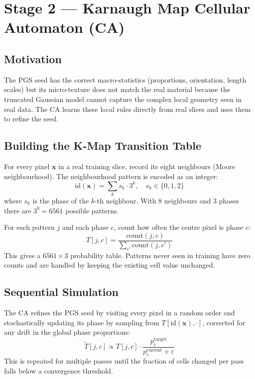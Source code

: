 \documentclass[11pt, a4paper]{article}
\begin{document}
\section{Stage 2 --- Karnaugh Map Cellular Automaton (CA)}

\subsection{Motivation}

The PGS seed has the correct macro-statistics (proportions, orientation, length scales) but its micro-texture does not match the real material because the truncated Gaussian model cannot capture the complex local geometry seen in real data. The CA learns these local rules directly from real slices and uses them to refine the seed.

\subsection{Building the K-Map Transition Table}

For every pixel $\mathbf{x}$ in a real training slice, record its eight neighbours (Moore neighbourhood). The neighbourhood pattern is encoded as an integer:
\begin{equation}
    \text{id}(\mathbf{x}) = \sum_{k} s_k \cdot 3^k, \quad s_k \in \{0,1,2\}
\end{equation}
where $s_k$ is the phase of the $k$-th neighbour. With 8 neighbours and 3 phases there are $3^8 = 6561$ possible patterns.

For each pattern $j$ and each phase $c$, count how often the centre pixel is phase $c$:
\begin{equation}
    T[j, c] = \frac{\text{count}(j, c)}{\sum_{c'} \text{count}(j, c')}
\end{equation}
This gives a $6561 \times 3$ probability table. Patterns never seen in training have zero counts and are handled by keeping the existing cell value unchanged.

\subsection{Sequential Simulation}

The CA refines the PGS seed by visiting every pixel in a random order and stochastically updating its phase by sampling from $T[\text{id}(\mathbf{x}), \cdot]$, corrected for any drift in the global phase proportions:
\begin{equation}
    \tilde{T}[j,c] \propto T[j,c] \cdot \frac{p_c^{\text{target}}}{p_c^{\text{current}} + \varepsilon}
\end{equation}
This is repeated for multiple passes until the fraction of cells changed per pass falls below a convergence threshold.
\end{document}
